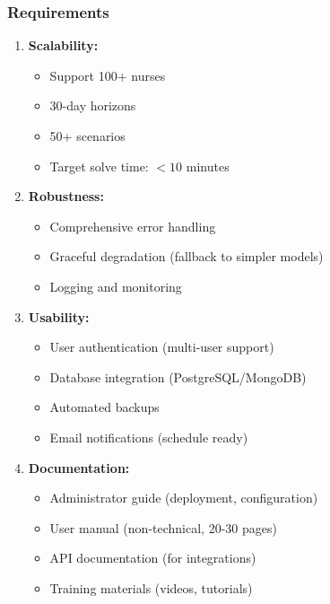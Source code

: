 \documentclass[11pt,letterpaper]{article}
\begin{document}
\subsubsection{Requirements}
\begin{enumerate}[leftmargin=*]
    \item \textbf{Scalability:}
    \begin{itemize}[leftmargin=*]
        \item Support 100+ nurses
        \item 30-day horizons
        \item 50+ scenarios
        \item Target solve time: $< 10$ minutes
    \end{itemize}
    \item \textbf{Robustness:}
    \begin{itemize}[leftmargin=*]
        \item Comprehensive error handling
        \item Graceful degradation (fallback to simpler models)
        \item Logging and monitoring
    \end{itemize}
    \item \textbf{Usability:}
    \begin{itemize}[leftmargin=*]
        \item User authentication (multi-user support)
        \item Database integration (PostgreSQL/MongoDB)
        \item Automated backups
        \item Email notifications (schedule ready)
    \end{itemize}
    \item \textbf{Documentation:}
    \begin{itemize}[leftmargin=*]
        \item Administrator guide (deployment, configuration)
        \item User manual (non-technical, 20-30 pages)
        \item API documentation (for integrations)
        \item Training materials (videos, tutorials)
    \end{itemize}
\end{enumerate}
\end{document}
